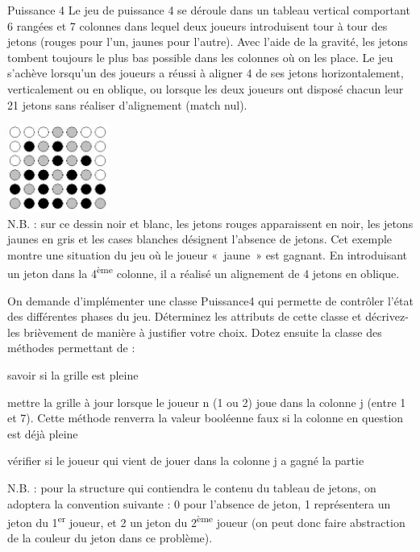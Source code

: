 \begin{Exercice}{Puissance 4}
	Le jeu de puissance 4 se déroule dans un tableau vertical comportant 6
	rangées et 7 colonnes dans lequel deux joueurs introduisent tour à tour
	des jetons (rouges pour l’un, jaunes pour l’autre). Avec l’aide de la
	gravité, les jetons tombent toujours le plus bas possible dans les
	colonnes où on les place. Le jeu s’achève lorsqu’un des joueurs a
	réussi à aligner 4 de ses jetons horizontalement, verticalement ou en
	oblique, ou lorsque les deux joueurs ont disposé chacun leur 21 jetons
	sans réaliser d’alignement (match nul).


	
		\includegraphics[width=0.25\textwidth]{image/puissance4} \\
		N.B. : sur ce dessin noir et
		blanc, les jetons rouges apparaissent en noir, les jetons jaunes en
		gris et les cases blanches désignent l'absence de
		jetons. Cet exemple montre une situation du jeu où le joueur «~jaune~»
		est gagnant. En introduisant un jeton dans la
		4\textsuperscript{ème} colonne,
		il a réalisé un alignement de 4 jetons en oblique.

	
	On demande d’implémenter une classe Puissance4 qui permette de contrôler
	l’état des différentes phases du jeu. Déterminez les attributs de cette
	classe et décrivez-les brièvement de manière à justifier votre choix.
	Dotez ensuite la classe des méthodes permettant de :

	\begin{liste}
		\item 
			savoir si la grille est pleine
		\item 
			mettre la grille à jour lorsque le joueur n (1 ou 2) joue dans la
			colonne j (entre 1 et 7). Cette méthode renverra la valeur booléenne
			faux si la colonne en question est déjà pleine
		\item 
			vérifier si le joueur qui vient de jouer dans la colonne j a gagné la
			partie
	\end{liste}
	
	N.B. : pour la structure qui contiendra le contenu du tableau de jetons,
	on adoptera la convention suivante : 0 pour l’absence de jeton, 1
	représentera un jeton du 1\textsuperscript{er} joueur, et 2 un jeton du
	2\textsuperscript{ème} joueur (on peut donc faire abstraction de la
	couleur du jeton dans ce problème).
\end{Exercice}

